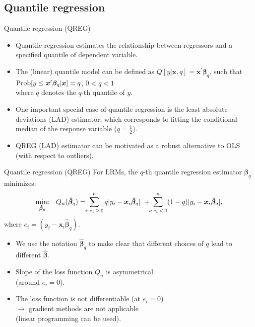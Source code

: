\documentclass{beamer}
\begin{document}
\subsection{Quantile regression}
\begin{frame}{Quantile regression (QREG)}
\begin{itemize}
\item Quantile regression estimates the relationship between regressors and a specified quantile of dependent variable.
\medskip
\item The (linear) quantile model can be defined as $Q[y|\bm{x}, q]=\bm{x}^{\prime}\bm{\beta}_q$, such that $\textnormal{Prob}[y \le \bm{x}^{\prime}\bm{\beta}_q|\bm{x}]=q$, $0<q<1$ \\where $q$ denotes the $q$-th quantile of $y$.
\medskip
\item One important special case of quantile regression is the least absolute deviations (LAD) estimator, which corresponds to fitting the conditional median of the response variable ($q=\frac{1}{2}$).
\medskip
\item QREG (LAD) estimator can be motivated as a robust  alternative to OLS (with respect to outliers).
\end{itemize}
\end{frame}
\begin{frame}{Quantile regression (QREG)}
For LRMs, the $q$-th quantile regression estimator $\bm{\beta}_q$ minimizes:
$$
\underset{\bm{\hat{\beta}}_q}{\textnormal{min:}} \quad Q_n(\bm{\hat{\beta}}_q) =
\! \! \sum^n_{i:\, e_i \, \geq \, 0} q|y_i - \bm{x}_i\bm{\hat{\beta}}_q| \,\, +
\! \! \sum^n_{i:\, e_i\, < \, 0} (1-q)|y_i - \bm{x}_i\bm{\hat{\beta}}_q|,
$$
where $e_i = (y_i - \bm{x}_i\bm{\hat{\beta}}_q)$.

\begin{itemize}
    \item We use the notation $\bm{\hat{\beta}}_q$ to make clear that different choices of $q$ lead to different  $\bm{\hat{\beta}}$.
    \item Slope of the loss function $Q_n$ is asymmetrical \\(around $e_i=0$).
    \item The loss function is not differentiable (at $e_i=0$) \\$\rightarrow$ gradient methods are not applicable \\(linear programming can be used).
\end{itemize}
\end{frame}
\end{document}
